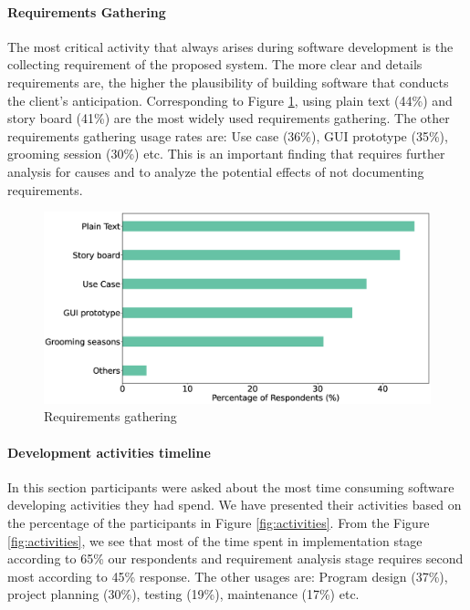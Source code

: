 \paragraph{Requirements Gathering}
The most critical activity that always arises during software development is the collecting requirement of the proposed system. The more clear and details requirements are, the higher the plausibility of building software that conducts the client’s anticipation. Corresponding to Figure \ref{fig:requirements}, using plain text (44\%) and story board (41\%) are the most widely used requirements gathering. The other requirements gathering usage rates are: Use case (36\%), GUI prototype (35\%), grooming session (30\%) etc. This is an important finding that requires further analysis for causes and to analyze the potential effects of not documenting requirements.

\begin{figure}[h]
\centering
  \includegraphics[scale=0.18]{Figures/Requirements_Gathering}
  \caption{Requirements gathering}
  \label{fig:requirements}
\end{figure}


\paragraph{Development activities timeline}
In this section participants were asked about the most time consuming software developing activities they had spend. We have presented their activities based on the percentage of the participants in Figure \ref{fig:activities}. From the Figure \ref{fig:activities}, we see that most of the time spent in implementation stage according to 65\% our respondents and requirement analysis stage requires second most according to 45\% response. The other usages are: Program design (37\%), project planning (30\%), testing (19\%), maintenance (17\%) etc.

